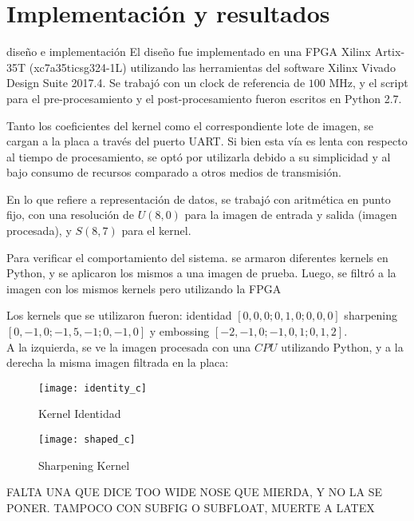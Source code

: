 \chapter{Implementación y resultados}  \label{implementations_sec}
 diseño e implementación
El diseño fue implementado en una FPGA Xilinx Artix-35T (xc7a35ticsg324-1L) utilizando las herramientas del software
Xilinx Vivado Design Suite 2017.4. Se trabajó con un clock de referencia de $100$ MHz, y el script para el pre-procesamiento 
y el post-procesamiento fueron escritos en Python 2.7.

Tanto los coeficientes del kernel como el correspondiente lote de imagen, se cargan a la placa a través
del puerto UART. Si bien esta vía es lenta con respecto al tiempo de procesamiento, se optó por utilizarla
debido a su simplicidad y al bajo consumo de recursos comparado a otros medios de transmisión.

En lo que refiere a representación de datos, se trabajó con aritmética en punto fijo, con una
resolución de $U(8,0)$ para la imagen de entrada y salida (imagen procesada), y $S(8,7)$ para el kernel.


Para verificar el comportamiento del sistema. se armaron diferentes kernels
en Python, y se aplicaron los mismos a una imagen de prueba. Luego, 
se filtró a la imagen con los mismos kernels  pero utilizando la FPGA

Los kernels que se utilizaron fueron: identidad $[0, 0, 0; 0, 1, 0; 0, 0,
0]$ sharpening $[0, -1, 0; -1, 5, -1; 0, -1, 0]$ y embossing $[-2, -1, 0; -1,
0, 1; 0, 1, 2]$.\\


A la izquierda, se ve la imagen procesada con una $CPU$ utilizando Python, y a la derecha
la misma imagen filtrada en la placa:


\begin{figure}
\centering
\texttt{[image: identity\_c]}
\caption{Kernel Identidad}
\label{identity}
\end{figure}
\begin{figure}[H]
\centering
\texttt{[image: shaped\_c]}
\caption{Sharpening Kernel}
\label{sharp}
\end{figure}

FALTA UNA QUE DICE TOO WIDE NOSE QUE MIERDA, Y NO LA SE PONER. TAMPOCO CON SUBFIG O SUBFLOAT, MUERTE A LATEX
\bigskip
\bigskip
\bigskip
\bigskip
\bigskip
\bigskip
\bigskip
\bigskip
\bigskip
\bigskip
\bigskip
\bigskip
\bigskip
\bigskip
\bigskip
\bigskip
\bigskip
\bigskip
\bigskip

